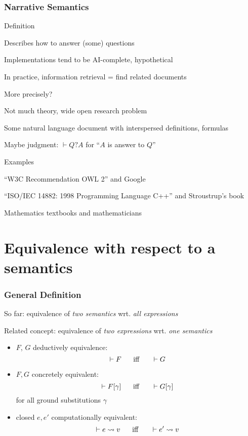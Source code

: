 \begin{frame}\frametitle{Narrative Semantics}
\begin{blockitems}{Definition}
\item Describes how to answer (some) questions
\item Implementations tend to be AI-complete, hypothetical
\item In practice, information retrieval = find related documents
\end{blockitems}

\begin{blockitems}{More precisely?}
\item Not much theory, wide open research problem
\item Some natural language document with interspersed definitions, formulas
\item Maybe judgment: $\vdash Q ? A$ for ``$A$ is answer to $Q$''
\end{blockitems}

\begin{blockitems}{Examples}
\item ``W3C Recommendation OWL 2'' and Google
\item ``ISO/IEC 14882: 1998 Programming Language C++'' and Stroustrup's book
\item Mathematics textbooks and mathematicians
\end{blockitems}
\end{frame}

\section{Equivalence with respect to a semantics}

\begin{frame}\frametitle{General Definition}
So far: equivalence of \emph{two semantics} wrt. \emph{all expressions}

Related concept: equivalence of \emph{two expressions} wrt. \emph{one semantics}
\begin{itemize}
\item $F$, $G$ deductively equivalence: \[\vdash F \hspace*{.5cm}\;\mathrm{iff}\;\hspace*{.5cm} \vdash G\]
\item $F,G$ concretely equivalent: \[\vdash F[\gamma] \hspace*{.5cm}\;\mathrm{iff}\;\hspace*{.5cm} \vdash G[\gamma]\] for all ground substitutions $\gamma$
\item closed $e,e'$ computationally equivalent: \[\vdash e\rightsquigarrow v \hspace*{.5cm}\;\mathrm{iff}\;\hspace*{.5cm} \vdash e'\rightsquigarrow v\]
\end{itemize}
\end{frame}


